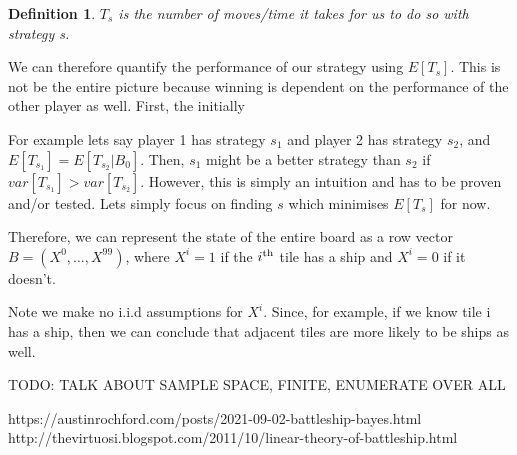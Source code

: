 \documentclass[11pt]{article}
\newtheorem{definition}{Definition}
\begin{document}
\begin{definition}
 $T_s$ is the number of moves/time it takes for us to do so with strategy s.
\end{definition}

We can therefore quantify the performance of our strategy using $E[T_s]$. This is not be the entire picture because winning is dependent on the performance of the other player as well. First, the initially

For example lets say player 1 has strategy $s_1$ and player 2 has strategy $s_2$, and $E[T_{s_1}] = E[T_{s_2}|B_0]$. Then, $s_1$ might be a better strategy than $s_2$ if $var[T_{s_1}] > var[T_{s_2}]$. However, this is simply an intuition and has to be proven and/or tested. Lets simply focus on finding $s$ which minimises $E[T_s]$ for now. 



Therefore, we can represent the state of the entire board as a row vector $B = (X^0,...,X^{99})$, where $X^i = 1$ if the $i\textsuperscript{th}$ tile has a ship and $X^i = 0$ if it doesn't.

Note we make no i.i.d assumptions for $X^i$. Since, for example, if we know tile i has a ship, then we can conclude that adjacent tiles are more likely to be ships as well.

TODO: TALK ABOUT SAMPLE SPACE, FINITE, ENUMERATE OVER ALL

\begin{thebibliography}{11}

 https://austinrochford.com/posts/2021-09-02-battleship-bayes.html
 http://thevirtuosi.blogspot.com/2011/10/linear-theory-of-battleship.html
\end{thebibliography}
\end{document}

